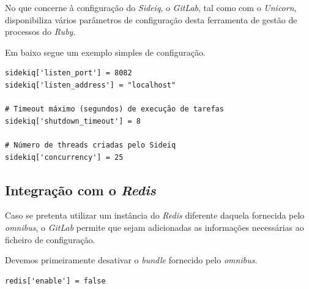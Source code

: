 \documentclass[12pt,a4paper]{article}
\begin{document}
No que concerne à configuração do \emph{Sideiq}, o \emph{GitLab}, tal como com o \emph{Unicorn}, disponibiliza vários parâmetros de configuração desta ferramenta de gestão de processos do \emph{Ruby}.

Em baixo segue um exemplo simples de configuração.

\begin{verbatim}
sidekiq['listen_port'] = 8082
sidekiq['listen_address'] = "localhost"

# Timeout máximo (segundos) de execução de tarefas
sidekiq['shutdown_timeout'] = 8

# Número de threads criadas pelo Sideiq
sidekiq['concurrency'] = 25
\end{verbatim}


\subsection{Integração com o \emph{Redis}}

Caso se pretenta utilizar um instância do \emph{Redis} diferente daquela fornecida pelo \emph{omnibus}, o \emph{GitLab} permite que sejam adicionadas as informações necessárias ao ficheiro de configuração. 

Devemos primeiramente desativar o \emph{bundle} fornecido pelo \emph{omnibus}.

\begin{verbatim}
redis['enable'] = false  
\end{verbatim}
\end{document}
